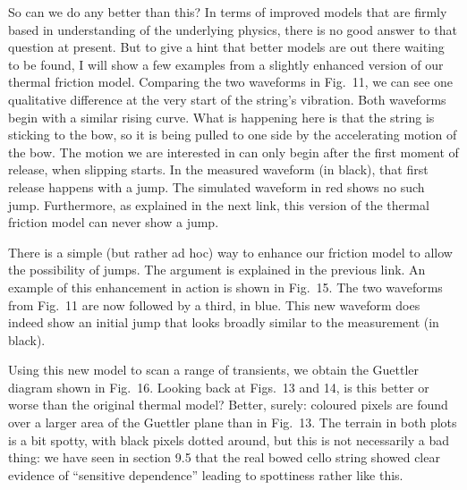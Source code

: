   So can we do any better than this? In terms of improved models that are 
  firmly based in understanding of the underlying physics, there is no good 
  answer to that question at present. But to give a hint that better models are 
  out there waiting to be found, I will show a few examples from a slightly 
  enhanced version of our thermal friction model. Comparing the two waveforms 
  in Fig.\ 11, we can see one qualitative difference at the very start of the 
  string's vibration. Both waveforms begin with a similar rising curve. What is 
  happening here is that the string is sticking to the bow, so it is being 
  pulled to one side by the accelerating motion of the bow. The motion we are 
  interested in can only begin after the first moment of release, when slipping 
  starts. In the measured waveform (in black), that first release happens with 
  a jump. The simulated waveform in red shows no such jump. Furthermore, as 
  explained in the next link, this version of the thermal friction model can 
  never show a jump. 

  There is a simple (but rather ad hoc) way to enhance our friction model to 
  allow the possibility of jumps. The argument is explained in the previous 
  link. An example of this enhancement in action is shown in Fig.\ 15. The two 
  waveforms from Fig.\ 11 are now followed by a third, in blue. This new 
  waveform does indeed show an initial jump that looks broadly similar to the 
  measurement (in black). 


  Using this new model to scan a range of transients, we obtain the Guettler 
  diagram shown in Fig.\ 16. Looking back at Figs.\ 13 and 14, is this better 
  or worse than the original thermal model? Better, surely: coloured pixels are 
  found over a larger area of the Guettler plane than in Fig.\ 13. The terrain 
  in both plots is a bit spotty, with black pixels dotted around, but this is 
  not necessarily a bad thing: we have seen in section 9.5 that the real bowed 
  cello string showed clear evidence of ``sensitive dependence'' leading to 
  spottiness rather like this. 


